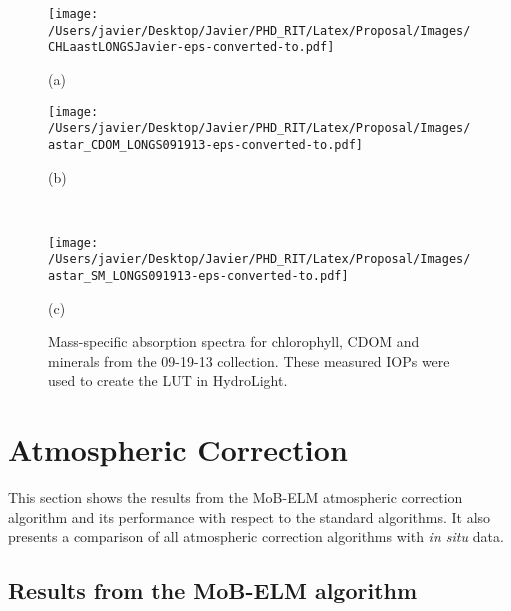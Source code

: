 \begin{figure}[htb!]
    \begin{minipage}[c]{0.48\linewidth}
      \centering
    \texttt{[image: /Users/javier/Desktop/Javier/PHD\_RIT/Latex/Proposal/Images/CHLaastLONGSJavier-eps-converted-to.pdf]}
     \centerline{(a)}\medskip
    \end{minipage}
    \hfill
    \begin{minipage}[d]{0.48\linewidth}
      \centering
    \texttt{[image: /Users/javier/Desktop/Javier/PHD\_RIT/Latex/Proposal/Images/astar\_CDOM\_LONGS091913-eps-converted-to.pdf]}
     \centerline{(b)}\medskip
    \end{minipage}\\
    
    \begin{minipage}[d]{1.0\linewidth}
      \centering
    \texttt{[image: /Users/javier/Desktop/Javier/PHD\_RIT/Latex/Proposal/Images/astar\_SM\_LONGS091913-eps-converted-to.pdf]}
      \centerline{(c)}\medskip
    \end{minipage}
  \caption[Mass-specific absorption spectra for chlorophyll, CDOM and minerals from the 09-19-13 collection.]{Mass-specific absorption spectra for chlorophyll, CDOM and minerals from the 09-19-13 collection. These measured IOPs were used to create the LUT in HydroLight. \label{fig:IOPastLONGS} }  
\end{figure}

\section{Atmospheric Correction}
\label{sec:AC_Results}
This section shows the results from the MoB-ELM atmospheric correction algorithm and its performance with respect to the standard algorithms. It also presents a comparison of all atmospheric correction algorithms with {\it in situ} data.

\subsection{Results from the MoB-ELM algorithm}

